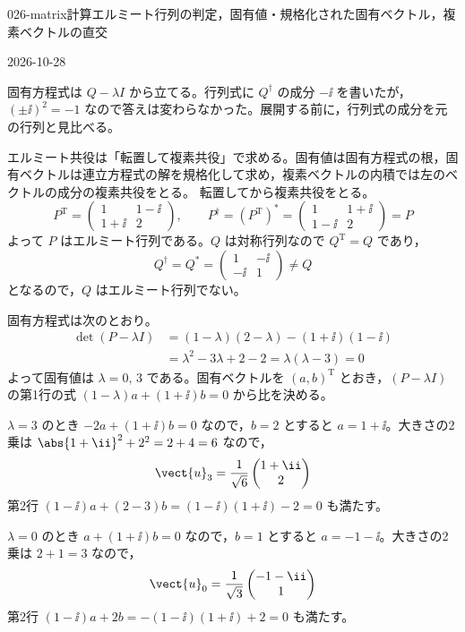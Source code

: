 \documentclass[uplatex,dvipdfmx,a4paper,11pt]{jsarticle}
\begin{document}
\begin{mondai}{026-matrix}{計算}{エルミート行列の判定，固有値・規格化された固有ベクトル，複素ベクトルの直交}
\begin{maekizuki}{2026-10-28}
\item 固有方程式は $Q-\lambda I$ から立てる。行列式に $Q^{\dagger}$ の成分 $-\ii$ を書いたが，$(\pm\ii)^{2}=-1$ なので答えは変わらなかった。展開する前に，行列式の成分を元の行列と見比べる。
\end{maekizuki}
\begin{tadashii}
\houshin エルミート共役は「転置して複素共役」で求める。固有値は固有方程式の根，固有ベクトルは連立方程式の解を規格化して求め，複素ベクトルの内積では左のベクトルの成分の複素共役をとる。
\keisan {} 転置してから複素共役をとる。
\[ P^{\mathrm{T}}=\begin{pmatrix}1 & 1-\ii\\ 1+\ii & 2\end{pmatrix},\qquad P^{\dagger}=(P^{\mathrm{T}})^{*}=\begin{pmatrix}1 & 1+\ii\\ 1-\ii & 2\end{pmatrix}=P \]
よって $P$ はエルミート行列である。$Q$ は対称行列なので $Q^{\mathrm{T}}=Q$ であり，
\[ Q^{\dagger}=Q^{*}=\begin{pmatrix}1 & -\ii\\ -\ii & 1\end{pmatrix}\neq Q \]
となるので，$Q$ はエルミート行列でない。

 固有方程式は次のとおり。
\begin{align*}
\det(P-\lambda I)&=(1-\lambda)(2-\lambda)-(1+\ii)(1-\ii)\\
&=\lambda^{2}-3\lambda+2-2=\lambda(\lambda-3)=0
\end{align*}
よって固有値は $\lambda=0,\,3$ である。固有ベクトルを $(a,b)^{\mathrm{T}}$ とおき，$(P-\lambda I)$ の第1行の式 $(1-\lambda)a+(1+\ii)b=0$ から比を決める。

$\lambda=3$ のとき $-2a+(1+\ii)b=0$ なので，$b=2$ とすると $a=1+\ii$。大きさの2乗は $\abs{1+\ii}^{2}+2^{2}=2+4=6$ なので，
\[ \vect{u}_{3}=\frac{1}{\sqrt{6}}\begin{pmatrix}1+\ii\\ 2\end{pmatrix} \]
第2行 $(1-\ii)a+(2-3)b=(1-\ii)(1+\ii)-2=0$ も満たす。

$\lambda=0$ のとき $a+(1+\ii)b=0$ なので，$b=1$ とすると $a=-1-\ii$。大きさの2乗は $2+1=3$ なので，
\[ \vect{u}_{0}=\frac{1}{\sqrt{3}}\begin{pmatrix}-1-\ii\\ 1\end{pmatrix} \]
第2行 $(1-\ii)a+2b=-(1-\ii)(1+\ii)+2=0$ も満たす。


\end{tadashii}
\end{mondai}
\end{document}
